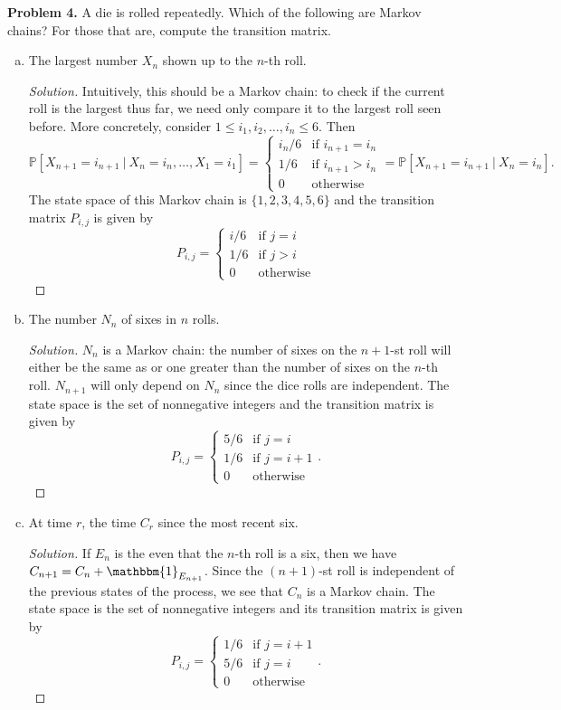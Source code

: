 \documentclass[11pt,letterpaper]{report}
\newcommand{\Prob}{\mathbb{P}}
\newcommand{\ind}{\mathbbm{1}}
\newenvironment{solution}
{\begin{proof}[Solution]}
{\end{proof}}
\begin{document}
\noindent\textbf{Problem 4. }
A die is rolled repeatedly. Which of the following are Markov chains? For those that are, compute the transition matrix.
\begin{enumerate}[(a)]
	\item The largest number $X_n$ shown up to the $n$-th roll.
	\begin{solution}
		Intuitively, this should be a Markov chain: to check if the current roll is the largest thus far, we need only compare it to the largest roll seen before. More concretely, consider $1\leq i_1, i_2,  \ldots, i_n\leq 6$. Then
		\[
		\Prob[X_{n+1} = i_{n+1}\ |\ X_n = i_n, \ldots, X_1 = i_1] = \begin{cases}
			i_n/6&\text{if }i_{n+1} = i_n\\
			1/6&\text{if }i_{n+1} > i_n\\
			0&\text{otherwise}
		\end{cases} = \Prob[X_{n+1} = i_{n+1}\ |\ X_n = i_n].
		\]
		The state space of this Markov chain is $\{1, 2, 3, 4, 5, 6\}$ and the transition matrix $P_{i,j}$ is given by
		\[
		P_{i,j}= \begin{cases}
			i/6&\text{if }j = i\\
			1/6&\text{if }j > i\\
			0&\text{otherwise}
		\end{cases}
		\]
	\end{solution}

	\item The number $N_n$ of sixes in $n$ rolls.
	\begin{solution}
		$N_n$ is a Markov chain: the number of sixes on the $n+1$-st roll will either be the same as or one greater than the number of sixes on the $n$-th roll. $N_{n+1}$ will only depend on $N_n$ since the dice rolls are independent. The state space is the set of nonnegative integers and the transition matrix is given by
		\[
		P_{i,j} = \begin{cases}
			5/6&\text{if }j = i\\
			1/6&\text{if }j = i+1\\
			0&\text{otherwise}
		\end{cases}.
		\]
	\end{solution}

	\item At time $r$, the time $C_r$ since the most recent six.
	\begin{solution}
		If $E_n$ is the even that the $n$-th roll is a six, then we have $C_{n+1} = C_n + \ind_{E_{n+1}}$. Since the $(n+1)$-st roll is independent of the previous states of the process, we see that $C_n$ is a Markov chain. The state space is the set of nonnegative integers and its transition matrix is given by
		\[
		P_{i,j} = \begin{cases}
			1/6&\text{if }j = i+1\\
			5/6&\text{if }j = i\\
			0&\text{otherwise}
		\end{cases}.
		\]
	\end{solution}


\end{enumerate}
\end{document}
